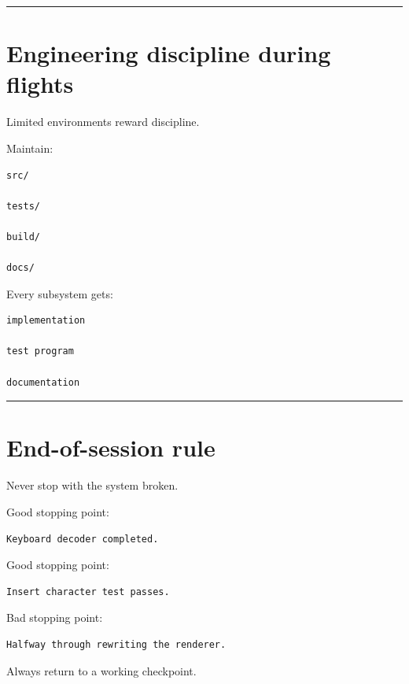 \documentclass[
  oneside,
  openany]{book}
\begin{document}
\begin{center}\rule{0.5\linewidth}{0.5pt}\end{center}

\hypertarget{engineering-discipline-during-flights}{%
\section{Engineering discipline during
flights}\label{engineering-discipline-during-flights}}

Limited environments reward discipline.

Maintain:

\begin{verbatim}
src/

tests/

build/

docs/
\end{verbatim}

Every subsystem gets:

\begin{verbatim}
implementation

test program

documentation
\end{verbatim}

\begin{center}\rule{0.5\linewidth}{0.5pt}\end{center}

\hypertarget{end-of-session-rule}{%
\section{End-of-session rule}\label{end-of-session-rule}}

Never stop with the system broken.

Good stopping point:

\begin{verbatim}
Keyboard decoder completed.
\end{verbatim}

Good stopping point:

\begin{verbatim}
Insert character test passes.
\end{verbatim}

Bad stopping point:

\begin{verbatim}
Halfway through rewriting the renderer.
\end{verbatim}

Always return to a working checkpoint.
\end{document}
